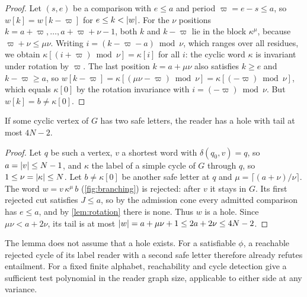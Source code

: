 \begin{proof}
Let $(s,e)$ be a comparison with $e \le a$ and period $\varpi = e - s \le a$, so
$w[k] = w[k-\varpi]$ for $e \le k < \lvert w\rvert$. For the $\nu$ positions $k = a+\varpi, \dots, a+\varpi+\nu-1$,
both $k$ and $k-\varpi$ lie in the block $\kappa^\mu$, because $\varpi + \nu \le \mu\nu$. Writing
$i = (k-\varpi-a) \bmod \nu$, which ranges over all residues, we obtain $\kappa[(i+\varpi) \bmod \nu] = \kappa[i]$
for all $i$: the cyclic word $\kappa$ is invariant under rotation by $\varpi$. The last position
$k = a + \mu\nu$ also satisfies $k \ge e$ and $k - \varpi \ge a$, so
$w[k-\varpi] = \kappa[(\mu\nu-\varpi) \bmod \nu] = \kappa[(-\varpi) \bmod \nu]$, which equals $\kappa[0]$ by the rotation
invariance with $i = (-\varpi) \bmod \nu$. But $w[k] = b \ne \kappa[0]$.
\end{proof}

\begin{lemma}\label{lem:branching}
If some cyclic vertex of $G$ has two safe letters, the reader has a hole with tail at most
$4N - 2$.
\end{lemma}

\begin{proof}
Let $q$ be such a vertex, $v$ a shortest word with $\delta(q_0,v) = q$, so $a = \lvert v\rvert \le
N - 1$, and $\kappa$ the label of a simple cycle of $G$ through $q$, so $1 \le \nu = \lvert \kappa\rvert
\le N$. Let $b \ne \kappa[0]$ be another safe letter at $q$ and
$\mu = \lceil (a+\nu)/\nu \rceil$. The word $w = v\,\kappa^\mu\,b$ (\cref{fig:branching}) is rejected:
after $v$ it stays in $G$. Its first rejected cut satisfies $J \le a$, so by the admission cone every
admitted comparison has $e \le a$, and by \cref{lem:rotation} there is none. Thus $w$ is a
hole. Since $\mu\nu < a + 2\nu$, its tail is at most $\lvert w\rvert = a + \mu\nu + 1 \le 2a + 2\nu \le
4N - 2$.
\end{proof}

The lemma does not assume that a hole exists. For a satisfiable $\phi$, a reachable rejected cycle of its
label reader with a second safe letter therefore already refutes entailment.
For a fixed finite alphabet, reachability and cycle detection give a
sufficient test polynomial in the reader graph size, applicable to either
side at any variance.

